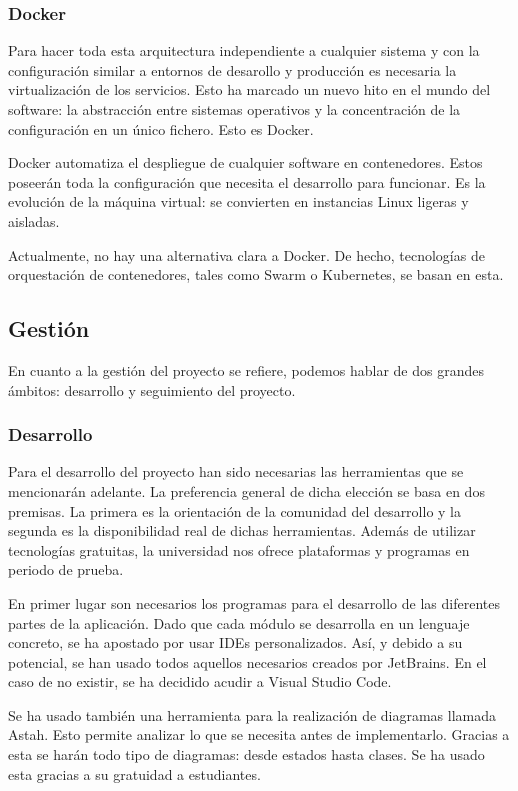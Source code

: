 \subsubsection{Docker}

Para hacer toda esta arquitectura independiente a cualquier sistema y con la configuración similar a entornos de desarollo y producción es necesaria la virtualización de los servicios. Esto ha marcado un nuevo hito en el mundo del software: la abstracción entre sistemas operativos y la concentración de la configuración en un único fichero. Esto es Docker.

Docker automatiza el despliegue de cualquier software en contenedores. Estos poseerán toda la configuración que necesita el desarrollo para funcionar. Es la evolución de la máquina virtual: se convierten en instancias Linux ligeras y aisladas.

Actualmente, no hay una alternativa clara a Docker. De hecho, tecnologías de orquestación de contenedores, tales como Swarm o Kubernetes, se basan en esta.

\subsection{Gestión}

En cuanto a la gestión del proyecto se refiere, podemos hablar de dos grandes ámbitos: desarrollo y seguimiento del proyecto.

\subsubsection{Desarrollo}

Para el desarrollo del proyecto han sido necesarias las herramientas que se mencionarán adelante. La preferencia general de dicha elección se basa en dos premisas. La primera es la orientación de la comunidad del desarrollo y la segunda es la disponibilidad real de dichas herramientas. Además de utilizar tecnologías gratuitas, la universidad nos ofrece plataformas y programas en periodo de prueba.

En primer lugar son necesarios los programas para el desarrollo de las diferentes partes de la aplicación. Dado que cada módulo se desarrolla en un lenguaje concreto, se ha apostado por usar IDEs personalizados. Así, y debido a su potencial, se han usado todos aquellos necesarios creados por JetBrains. En el caso de no existir, se ha decidido acudir a Visual Studio Code.

Se ha usado también una herramienta para la realización de diagramas llamada Astah. Esto permite analizar lo que se necesita antes de implementarlo. Gracias a esta se harán todo tipo de diagramas: desde estados hasta clases. Se ha usado esta gracias a su gratuidad a estudiantes.

